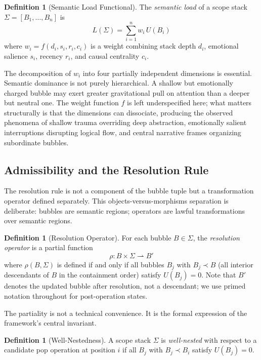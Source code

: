 \documentclass[12pt, a4paper]{article}
\theoremstyle{plain}
\theoremstyle{definition}
\newtheorem{definition}[theorem]{Definition}
\theoremstyle{remark}
\begin{document}
\begin{definition}[Semantic Load Functional]
The \emph{semantic load} of a scope stack $\Sigma = [B_1, \ldots, B_n]$ is
\[
  L(\Sigma) = \sum_{i=1}^{n} w_i \, U(B_i)
\]
where $w_i = f(d_i, s_i, r_i, c_i)$ is a weight combining stack depth $d_i$,
emotional salience $s_i$, recency $r_i$, and causal centrality $c_i$.
\end{definition}

The decomposition of $w_i$ into four partially independent dimensions is
essential. Semantic dominance is not purely hierarchical. A shallow but
emotionally charged bubble may exert greater gravitational pull on attention
than a deeper but neutral one. The weight function $f$ is left
underspecified here; what matters structurally is that the dimensions can
dissociate, producing the observed phenomena of shallow trauma overriding
deep abstraction, emotionally salient interruptions disrupting logical flow,
and central narrative frames organizing subordinate bubbles.

\subsection{Admissibility and the Resolution Rule}

The resolution rule is not a component of the bubble tuple but a
transformation operator defined separately. This objects-versus-morphisms
separation is deliberate: bubbles are semantic regions; operators are lawful
transformations over semantic regions.

\begin{definition}[Resolution Operator]
For each bubble $B \in \Sigma$, the \emph{resolution operator} is a partial
function
\[
  \rho : B \times \Sigma \rightharpoonup B'
\]
where $\rho(B, \Sigma)$ is defined if and only if all bubbles $B_j$ with
$B_j \prec B$ (all interior descendants of $B$ in the containment order)
satisfy $U(B_j) = 0$. Note that $B'$ denotes the updated bubble after
resolution, not a descendant; we use primed notation throughout for
post-operation states.
\end{definition}

The partiality is not a technical convenience. It is the formal expression
of the framework's central invariant.

\begin{definition}[Well-Nestedness]
A scope stack $\Sigma$ is \emph{well-nested} with respect to a candidate
pop operation at position $i$ if all $B_j$ with $B_j \prec B_i$ satisfy
$U(B_j) = 0$.
\end{definition}
\end{document}
